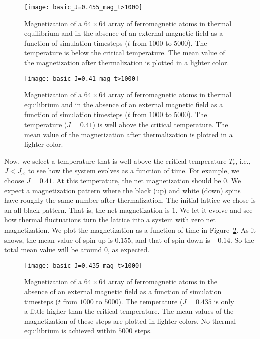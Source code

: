 \begin{figure}[hbt]
    \centering
    \texttt{[image: basic\_J=0.455\_mag\_t>1000]}
    \caption{Magnetization of a \(64 \times 64\) array of ferromagnetic atoms in thermal
        equilibrium and in the absence of an external magnetic field as a function of
        simulation timesteps (\(t\) from \(1000\) to \(5000\)). The temperature is below the
        critical temperature. The mean value of the magnetization after thermalization is
        plotted in a lighter color.}
    \label{fig:mag_J=0.455}
\end{figure}

\begin{figure}[hbt]
    \centering
    \texttt{[image: basic\_J=0.41\_mag\_t>1000]}
    \caption{Magnetization of a \(64 \times 64\) array of ferromagnetic atoms in thermal
        equilibrium and in the absence of an external magnetic field as a function of
        simulation timesteps (\(t\) from \(1000\) to \(5000\)). The temperature
        (\(J = 0.41\)) is well above the critical temperature. The mean value of the
        magnetization after thermalization is plotted in a lighter color.}
    \label{fig:mag_J=0.41}
\end{figure}

Now, we select a temperature that is well above the critical temperature \(T_c\),
i.e., \(J < J_c\), to see how the system evolves as a function of time.
For example, we choose \(J = 0.41\). At this temperature, the net magnetization should
be \(0\). We expect a magnetization pattern where the black (up) and
white (down) spins have roughly the same number after thermalization.
The initial lattice we chose is an all-black pattern. That is, the net magnetization
is \(1\). We let it evolve and see how thermal fluctuations turn the lattice into
a system with zero net magnetization.
We plot the magnetization as a function of time in Figure~\ref{fig:mag_J=0.41}.
As it shows, the mean value of spin-up is \(0.155\), and that of spin-down is \(-0.14\).
So the total mean value will be around \(0\), as expected.

\begin{figure}[hbt]
    \centering
    \texttt{[image: basic\_J=0.435\_mag\_t>1000]}
    \caption{Magnetization of a \(64 \times 64\) array of ferromagnetic atoms in the absence
        of an external magnetic field as a function of simulation timesteps (\(t\) from
        \(1000\) to \(5000\)). The temperature (\(J = 0.435\) is only a little higher than
        the critical temperature. The mean values of the magnetization of these steps are
        plotted in lighter colors. No thermal equilibrium is achieved within \(5000\)
        steps.}
    \label{fig:mag_J=0.435}
\end{figure}


